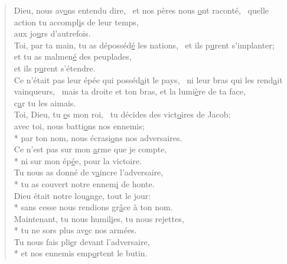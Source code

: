 \begin{verse}

Dieu, nous av\underline{o}ns entendu dire,~\psalmdagger
et nos pères nous \underline{o}nt raconté,~\psalmstar
quelle action tu accompl\underline{i}s de leur temps, \\
aux jo\underline{u}rs d’autrefois. \\

Toi, par ta main, tu as déposséd\underline{é} les nations,~\psalmdagger
et ils p\underline{u}rent s’implanter;~\psalmstar
et tu as malmen\underline{é} des peuplades, \\
et ils p\underline{u}rent s’étendre. \\

Ce n’était pas leur épée qui posséd\underline{a}it le pays,~\psalmdagger
ni leur bras qui les rend\underline{a}it vainqueurs,~\psalmstar
mais ta droite et ton bras, et la lumi\underline{è}re de ta face, \\
c\underline{a}r tu les aimais. \\

Toi, Dieu, tu \underline{e}s mon roi,~\psalmstar
tu décides des vict\underline{o}ires de Jacob: \\
avec toi, nous batti\underline{o}ns nos ennemis; \\*
par ton nom, nous écrasi\underline{o}ns nos adversaires. \\

Ce n’est pas sur mon \underline{a}rme que je compte, \\*
ni sur mon ép\underline{é}e, pour la victoire. \\
Tu nous as donné de v\underline{a}incre l’adversaire, \\*
tu as couvert notre ennem\underline{i} de honte. \\

Dieu était notre lou\underline{a}nge, tout le jour: \\*
sans cesse nous rendions gr\underline{â}ce à ton nom. \\

Maintenant, tu nous humil\underline{i}es, tu nous rejettes, \\*
tu ne sors plus av\underline{e}c nos armées. \\
Tu nous fais pli\underline{e}r devant l’adversaire, \\*
et nos ennemis emp\underline{o}rtent le butin. \\


\end{verse}
